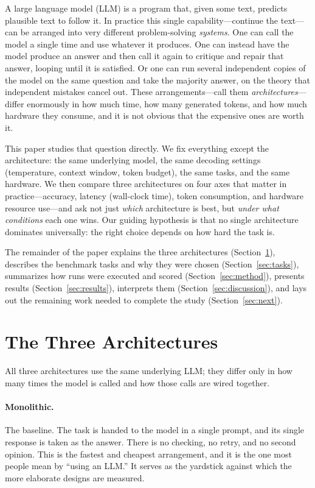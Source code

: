 \documentclass[sigconf,nonacm]{acmart}
\begin{document}
A large language model (LLM) is a program that, given some text, predicts
plausible text to follow it. In practice this single capability---continue the
text---can be arranged into very different problem-solving \emph{systems}. One
can call the model a single time and use whatever it produces. One can instead
have the model produce an answer and then call it again to critique and repair
that answer, looping until it is satisfied. Or one can run several independent
copies of the model on the same question and take the majority answer, on the
theory that independent mistakes cancel out. These arrangements---call them
\emph{architectures}---differ enormously in how much time, how many generated
tokens, and how much hardware they consume, and it is not obvious that the
expensive ones are worth it.

This paper studies that question directly. We fix everything except the
architecture: the same underlying model, the same decoding settings (temperature,
context window, token budget), the same tasks, and the same hardware. We then
compare three architectures on four axes that matter in practice---accuracy,
latency (wall-clock time), token consumption, and hardware resource use---and ask
not just \emph{which} architecture is best, but \emph{under what conditions} each
one wins. Our guiding hypothesis is that no single architecture dominates
universally: the right choice depends on how hard the task is.

The remainder of the paper explains the three architectures
(Section~\ref{sec:arch}), describes the benchmark tasks and why they were chosen
(Section~\ref{sec:tasks}), summarizes how runs were executed and scored
(Section~\ref{sec:method}), presents results (Section~\ref{sec:results}),
interprets them (Section~\ref{sec:discussion}), and lays out the remaining work
needed to complete the study (Section~\ref{sec:next}).

\section{The Three Architectures}
\label{sec:arch}

All three architectures use the same underlying LLM; they differ only in how many
times the model is called and how those calls are wired together.

\paragraph{Monolithic.} The baseline. The task is handed to the model in a single
prompt, and its single response is taken as the answer. There is no checking, no
retry, and no second opinion. This is the fastest and cheapest arrangement, and
it is the one most people mean by ``using an LLM.'' It serves as the yardstick
against which the more elaborate designs are measured.
\end{document}
